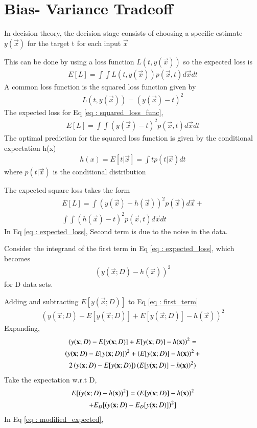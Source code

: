 \documentclass[journal,12pt,twocolumn]{IEEEtran}
\begin{document}
\section{Bias- Variance Tradeoff}
In decision theory, the decision stage consists of choosing a specific estimate $y(\vec{x})$ for the target t for each input $\vec{x}$

This can be done by using a loss function $L(t,y(\vec{x}))$ so the expected loss is
\begin{align}
    E[L] = \int \int L(t,y(\vec{x}))p(\vec{x},t)d\vec{x}dt
\end{align}
A common loss function is the squared loss function given by
\begin{align}
    L(t,y(\vec{x})) = (y(\vec{x}) - t)^2 \label{eq : squared_loss_func}
\end{align}
The expected loss for Eq \eqref{eq : squared_loss_func},
\begin{align}
    E[L] = \int \int (y(\vec{x}) - t)^2p(\vec{x},t)d\vec{x}dt
\end{align}
The optimal prediction for the squared loss function is given by the conditional expectation h(x)
\begin{align}
    h(x) = E[t |\vec{x}] = \int t p(t |\vec{x})dt
\end{align}
where $p(t | \vec{x})$ is the conditional distribution

The expected square loss takes the form
\begin{multline}
    E[L] = \int(y(\vec{x})-h(\vec{x}))^2p(\vec{x})d\vec{x} +\\ 
    \int \int(h(\vec{x}) - t)^2p(\vec{x},t)d\vec{x} dt \label{eq : expected_loss}
\end{multline}
In Eq \eqref{eq : expected_loss},
Second term is due to the noise in the data.

Consider the integrand of the first term in Eq \eqref{eq : expected_loss}, which becomes
\begin{align}
    (y(\vec{x};D) - h(\vec{x}))^2 \label{eq : first_term}
\end{align}
for D data sets.

Adding and subtracting $E[y(\vec{x};D)]$ to Eq \eqref{eq : first_term}
\begin{align}
    (y(\vec{x};D) - E[y(\vec{x};D)] + E[y(\vec{x};D)]- h(\vec{x}))^2
\end{align}
Expanding,
\begin{multline}
    \left(y(\mathbf{x};D) - E[y(\mathbf{x};D)] + E[y(\mathbf{x};D)]- h(\mathbf{x})\right)^2 = \\
      \left(y(\mathbf{x};D) - E[y(\mathbf{x};D)]\right)^2 + \left(E[y(\mathbf{x};D)]- h(\mathbf{x})\right)^2 + \\
      2\left(y(\mathbf{x};D) - E[y(\mathbf{x};D)]\right)\left(E[y(\mathbf{x};D)]- h(\mathbf{x})\right)^2)
\end{multline}
Take the expectation w.r.t D,
\begin{multline}
    E[(y(\mathbf{x};D) - h(\mathbf{x}))^2] = \left(E[y(\mathbf{x};D)]- h(\mathbf{x})\right)^2\\
       + E_{D}[(y(\mathbf{x};D) - E_{D}[y(\mathbf{x};D)])^2] \label{eq : modified_expected}
\end{multline}
In Eq \eqref{eq : modified_expected}, 
\end{document}
